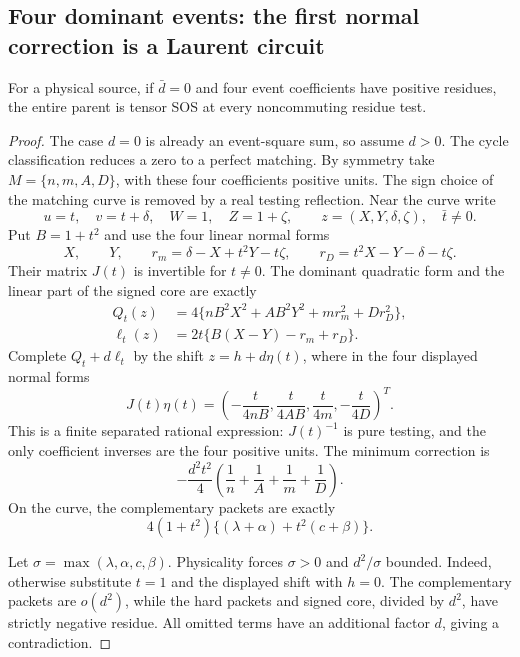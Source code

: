 \subsection{Four dominant events: the first normal correction is a Laurent circuit}
\begin{theorem}\label{p24f8a75e651e:thm:four-event-weighted}
For a physical source, if $\bar d=0$ and four event coefficients have positive residues, the entire parent is tensor SOS at every noncommuting residue test.
\end{theorem}
\begin{proof}
The case $d=0$ is already an event-square sum, so assume $d>0$. The cycle classification reduces a zero to a perfect matching. By symmetry take $M=\{n,m,A,D\}$, with these four coefficients positive units. The sign choice of the matching curve is removed by a real testing reflection. Near the curve write
\[
u=t,\quad v=t+\delta,\quad W=1,\quad Z=1+\zeta,
\qquad z=(X,Y,\delta,\zeta),\quad \bar t\ne0.
\]
Put $B=1+t^2$ and use the four linear normal forms
\[
X,\qquad Y,\qquad r_m=\delta-X+t^2Y-t\zeta,
\qquad r_D=t^2X-Y-\delta-t\zeta.
\]
Their matrix $J(t)$ is invertible for $t\ne0$. The dominant quadratic form and the linear part of the signed core are exactly
\begin{align*}
Q_t(z)&=4\{nB^2X^2+AB^2Y^2+m r_m^2+D r_D^2\},\\
\ell_t(z)&=2t\{B(X-Y)-r_m+r_D\}.
\end{align*}
Complete $Q_t+d\ell_t$ by the shift $z=h+d\eta(t)$, where in the four displayed normal forms
\[
J(t)\eta(t)=\left(-\frac{t}{4nB},\frac{t}{4AB},\frac{t}{4m},-\frac{t}{4D}\right)^T.
\]
This is a finite separated rational expression: $J(t)^{-1}$ is pure testing, and the only coefficient inverses are the four positive units. The minimum correction is
\[
-\frac{d^2t^2}{4}\left(\frac1n+\frac1A+\frac1m+\frac1D\right).
\]
On the curve, the complementary packets are exactly
\[
4(1+t^2)\{(\lambda+\alpha)+t^2(c+\beta)\}.
\]

Let $\sigma=\max(\lambda,\alpha,c,\beta)$. Physicality forces $\sigma>0$ and $d^2/\sigma$ bounded. Indeed, otherwise substitute $t=1$ and the displayed shift with $h=0$. The complementary packets are $o(d^2)$, while the hard packets and signed core, divided by $d^2$, have strictly negative residue. All omitted terms have an additional factor $d$, giving a contradiction.


\end{proof}
